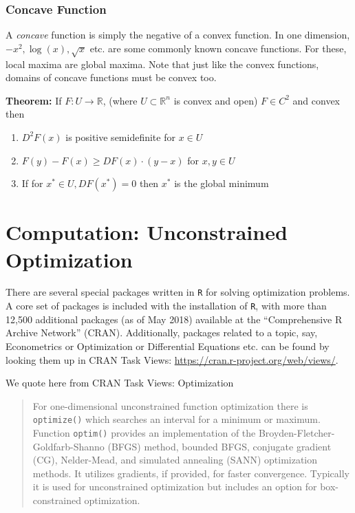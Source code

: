 \documentclass[11pt,]{article}
\providecommand{\tightlist}{%
  \setlength{\itemsep}{0pt}\setlength{\parskip}{0pt}}
\begin{document}
\subsubsection{Concave Function}\label{concave-function}

A \emph{concave} function is simply the negative of a convex function.
In one dimension, \(-x^2, \log(x), \sqrt{x}\) etc. are some commonly
known concave functions. For these, local maxima are global maxima. Note
that just like the convex functions, domains of concave functions must
be convex too.

\textbf{Theorem:} If \(F:U \to \mathbb{R}\), (where
\(U\subset \mathbb{R}^n\) is convex and open) \(F\in C^2\) and convex
then

\begin{enumerate}
\def\labelenumi{\arabic{enumi}.}
\tightlist
\item
  \(D^2F(x)\) is positive semidefinite for \(x\in U\)
\item
  \(F(y)-F(x)\geq DF(x)\cdot(y-x)\) for \(x, y\in U\)
\item
  If for \(x^*\in U, DF(x^*)=0\) then \(x^*\) is the global minimum
\end{enumerate}

\section{Computation: Unconstrained
Optimization}\label{computation-unconstrained-optimization}

There are several special packages written in \texttt{R} for solving
optimization problems. A core set of packages is included with the
installation of \texttt{R}, with more than 12,500 additional packages
(as of May 2018) available at the ``Comprehensive R Archive Network''
(CRAN). Additionally, packages related to a topic, say, Econometrics or
Optimization or Differential Equations etc. can be found by looking them
up in CRAN Task Views: \url{https://cran.r-project.org/web/views/}.

We quote here from CRAN Task Views: Optimization

\begin{quote}
For one-dimensional unconstrained function optimization there is
\texttt{optimize()} which searches an interval for a minimum or maximum.
Function \texttt{optim()} provides an implementation of the
Broyden-Fletcher-Goldfarb-Shanno (BFGS) method, bounded BFGS, conjugate
gradient (CG), Nelder-Mead, and simulated annealing (SANN) optimization
methods. It utilizes gradients, if provided, for faster convergence.
Typically it is used for unconstrained optimization but includes an
option for box-constrained optimization.
\end{quote}
\end{document}
